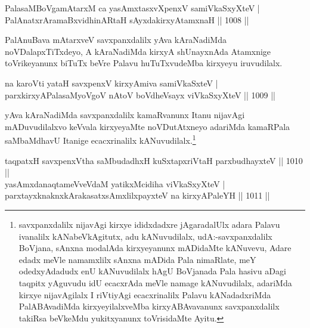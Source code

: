 
\begin{shl}
PalasaMBoVgamAtarxM ca yasAmxtasxvXpenxV samiVkaSxyXteV | \\
PalAnatxrAramaBxvidhinARtaH sAyxdakirxyAtamxnaH \hfill||  1008 ||  
\end{shl}

\begin{artha}
PalAnuBava mAtarxveV savxpanxdalilx yAva kAraNadiMda noVDalapxTiTxdeyo, A kAraNadiMda kirxyA shUnayxnAda Atamxnige toVrikeyanunx biTuTx beVre Palavu huTuTxvudeMba kirxyeyu iruvudilalx.
\end{artha}


\begin{shl}
na karoVti yataH savxpenxV kirxyAmiva samiVkaSxteV | \\
parxkirxyAPalasaMyoVgoV nAtoV boVdheV\s sayx viVkaSxyXteV \hfill||  1009 ||  
\end{shl}

\begin{artha}
yAva kAraNadiMda savxpanxdalilx kamaRvanunx Itanu nijavAgi mADuvudilalxvo keVvala kirxyeyaMte noVDutAtxneyo adariMda kamaRPala saMbaMdhavU Itanige ecacxrinalilx kANuvudilalx.\footnote{savxpanxdalilx nijavAgi kirxye ididxdadxre jAgaradalUlx adara Palavu ivanalilx kANabeVkAgitutx, adu kANuvudilalx, udA:-savxpanxdalilx BoVjana, sAnxna modalAda kirxyeyanunx mADidaMte kANuvevu, Adare edadx meVle namamxlilx sAnxna mADida Pala nimaRlate, meY odedxyAdadudx enU kANuvudilalx hAgU BoVjanada Pala hasivu aDagi taqpitx yAguvudu idU ecacxrAda meVle namage kANuvudilalx, adariMda kirxye nijavAgilalx I riVtiyAgi ecacxrinalilx Palavu kANadadxriMda PalABAvadiMda kirxyeyilalxveMba kirxyABAvavanunx savxpanxdalilx takiRsa beVkeMdu yukitxyanunx toVrisidaMte Ayitu.}
\end{artha}


\begin{shl}
taqpatxH savxpenxV\s tha saMbudadhxH kuSxtapxriVtaH parxbudhayxteV \hfill||  1010 || \\
yasAmxdanaqtameVveVdaM yatikxMcidiha viVkaSxyXteV | \\
parxtayxknaknxkArakasatxsAmxlilxpayxteV na kirxyAPaleYH \hfill||  1011 ||
\end{shl}

